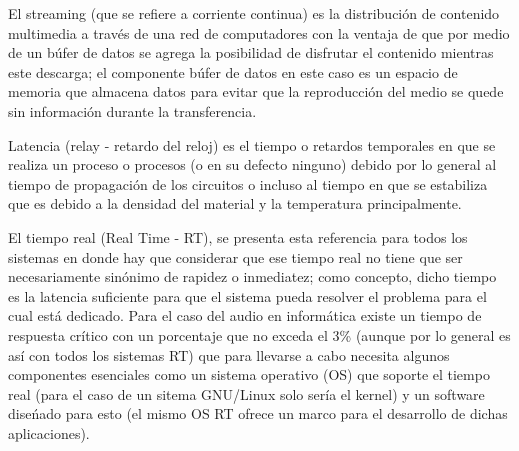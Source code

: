 \begin{multicols}{2}
\begin{center}
\end{center}

El streaming (que se refiere a corriente continua) es la distribución de contenido multimedia a través de una red de computadores con la ventaja de que por medio de un búfer de datos se agrega la posibilidad de disfrutar el contenido mientras este descarga; el componente búfer de datos en este caso es un espacio de memoria que almacena datos para evitar que la reproducción del medio se quede sin información durante la transferencia.


Latencia (relay - retardo del reloj) es el tiempo o retardos temporales en que se realiza un proceso o procesos (o en su defecto ninguno) debido por lo general al tiempo de propagación de los circuitos o incluso al tiempo en que se estabiliza que es debido a la densidad del material y la temperatura principalmente.

\begin{center}
\end{center}





\begin{center}
\end{center}

El tiempo real (Real Time - RT), se presenta esta referencia para todos los sistemas en donde hay que considerar que ese tiempo real no tiene que ser necesariamente sinónimo de rapidez o inmediatez; como concepto, dicho tiempo es la latencia suficiente para que el sistema pueda resolver el problema para el cual está dedicado. Para el caso del audio en informática existe un tiempo de respuesta crítico con un porcentaje que no exceda el 3\% (aunque por lo general es así con todos los sistemas RT) que para llevarse a cabo necesita algunos componentes esenciales como un sistema operativo (OS) que soporte el tiempo real (para el caso de un sitema GNU/Linux solo sería el kernel) y un software diseńado para esto (el mismo OS RT ofrece un marco para el desarrollo de dichas aplicaciones).


\end{multicols}
